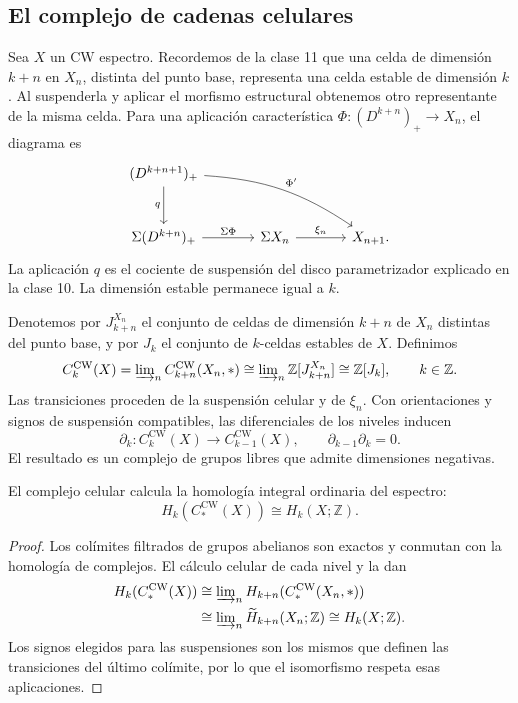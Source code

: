 \subsection{El complejo de cadenas celulares}
Sea $X$ un CW espectro. Recordemos de la clase 11 que una celda de dimensión $k+n$ en $X_n$, distinta del punto base, representa una celda estable de dimensión $k$. Al suspenderla y aplicar el morfismo estructural obtenemos otro representante de la misma celda. Para una aplicación característica $\Phi\colon(D^{k+n})_+\to X_n$, el diagrama es
\[
\begin{tikzcd}[column sep=large,row sep=large]
(D^{k+n+1})_+\arrow[d,"q"']
\arrow[drr,bend left=15,"\Phi' "]&&\\
\Sigma(D^{k+n})_+\arrow[r,"\Sigma\Phi"]
&\Sigma X_n\arrow[r,"\xi_n"]&X_{n+1}.
\end{tikzcd}
\]
La aplicación $q$ es el cociente de suspensión del disco parametrizador explicado en la clase 10. La dimensión estable permanece igual a $k$.

Denotemos por $J_{k+n}^{X_n}$ el conjunto de celdas de dimensión $k+n$ de $X_n$ distintas del punto base, y por $J_k$ el conjunto de $k$-celdas estables de $X$. Definimos
\[
C_k^{\mathrm{CW}}(X)
=\varinjlim\nolimits_n C_{k+n}^{\mathrm{CW}}(X_n,*)
\cong\varinjlim\nolimits_n\mathbb Z[J_{k+n}^{X_n}]
\cong\mathbb Z[J_k],
\qquad k\in\mathbb Z.
\]
Las transiciones proceden de la suspensión celular y de $\xi_n$. Con orientaciones y signos de suspensión compatibles, las diferenciales de los niveles inducen
\[
\partial_k\colon C_k^{\mathrm{CW}}(X)\longrightarrow C_{k-1}^{\mathrm{CW}}(X),
\qquad\partial_{k-1}\partial_k=0.
\]
El resultado es un complejo de grupos libres que admite dimensiones negativas.

\begin{prop}\label{prop:c21-homologia-celular}
El complejo celular calcula la homología integral ordinaria del espectro:
\[
H_k(C_*^{\mathrm{CW}}(X))\cong H_k(X;\mathbb Z).
\]
\end{prop}
\begin{proof}
Los colímites filtrados de grupos abelianos son exactos y conmutan con la homología de complejos. El cálculo celular de cada nivel y la  dan
\[
\begin{aligned}
H_k(C_*^{\mathrm{CW}}(X))
&\cong\varinjlim\nolimits_n H_{k+n}(C_*^{\mathrm{CW}}(X_n,*))\\
&\cong\varinjlim\nolimits_n\widetilde H_{k+n}(X_n;\mathbb Z)
\cong H_k(X;\mathbb Z).
\end{aligned}
\]
Los signos elegidos para las suspensiones son los mismos que definen las transiciones del último colímite, por lo que el isomorfismo respeta esas aplicaciones.
\end{proof}

